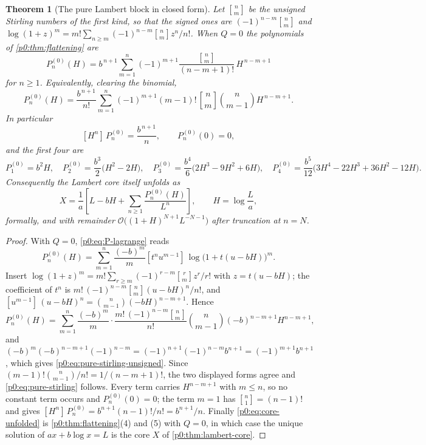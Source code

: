 \documentclass[11pt,a4paper,oneside]{book}
\theoremstyle{plain}
\newtheorem{theorem}{Theorem}[chapter]
\theoremstyle{definition}
\theoremstyle{remark}
\newcommand{\Coef}[1]{[#1]\,}
\newcommand{\bigO}{\mathcal{O}}
\newcommand{\stirlingfirst}[2]{\genfrac{[}{]}{0pt}{}{#1}{#2}}
\begin{document}
\begin{theorem}[The pure Lambert block in closed form]\label{p0:thm:pure-stirling}
Let $\stirlingfirst{n}{m}$ be the \emph{unsigned} Stirling numbers of the first
kind, so that the signed ones are
$(-1)^{n-m}\stirlingfirst{n}{m}$ and
$\log(1+z)^m=m!\sum_{n\ge m}(-1)^{n-m}\stirlingfirst{n}{m}z^n/n!$.  When $Q=0$
the polynomials of \cref{p0:thm:flattening} are
\begin{equation}\label{p0:eq:pure-stirling}
 \boxed{\;
 P_n^{(0)}(H)=b^{\,n+1}\sum_{m=1}^{n}(-1)^{m+1}
   \frac{\stirlingfirst{n}{m}}{(n-m+1)!}\,H^{\,n-m+1}\;}
\end{equation}
for $n\ge1$.  Equivalently, clearing the binomial,
\begin{equation}\label{p0:eq:pure-stirling-unsigned}
 P_n^{(0)}(H)=\frac{b^{\,n+1}}{n!}\sum_{m=1}^{n}(-1)^{m+1}(m-1)!\,
  \stirlingfirst{n}{m}\binom{n}{m-1}H^{\,n-m+1}.
\end{equation}
In particular
\begin{equation}\label{p0:eq:pure-lead}
 \Coef{H^n}P_n^{(0)}=\frac{b^{\,n+1}}{n},
 \qquad P_n^{(0)}(0)=0,
\end{equation}
and the first four are
\begin{equation}\label{p0:eq:pure-first}
 P_1^{(0)}=b^2H,\quad
 P_2^{(0)}=\frac{b^3}{2}\bigl(H^2-2H\bigr),\quad
 P_3^{(0)}=\frac{b^4}{6}\bigl(2H^3-9H^2+6H\bigr),\quad
 P_4^{(0)}=\frac{b^5}{12}\bigl(3H^4-22H^3+36H^2-12H\bigr).
\end{equation}
Consequently the Lambert core itself unfolds as
\begin{equation}\label{p0:eq:core-unfolded}
 X=\frac1a\left[L-bH+\sum_{n\ge1}\frac{P_n^{(0)}(H)}{L^n}\right],
 \qquad H=\log\frac La ,
\end{equation}
formally, and with remainder $\bigO\bigl((1+H)^{N+1}L^{-N-1}\bigr)$ after
truncation at $n=N$.
\end{theorem}

\begin{proof}
With $Q=0$, \eqref{p0:eq:P-lagrange} reads
\[
 P_n^{(0)}(H)=\sum_{m=1}^{n}\frac{(-b)^m}{m}
  \Coef{t^nu^{m-1}}\log\bigl(1+t(u-bH)\bigr)^m .
\]
Insert $\log(1+z)^m=m!\sum_{r\ge m}(-1)^{r-m}\stirlingfirst{r}{m}z^r/r!$ with
$z=t(u-bH)$; the coefficient of $t^n$ is
$m!\,(-1)^{n-m}\stirlingfirst{n}{m}(u-bH)^n/n!$, and
$\Coef{u^{m-1}}(u-bH)^n=\binom{n}{m-1}(-bH)^{n-m+1}$.  Hence
\[
 P_n^{(0)}(H)
 =\sum_{m=1}^{n}\frac{(-b)^m}{m}\cdot
   \frac{m!\,(-1)^{n-m}\stirlingfirst{n}{m}}{n!}
   \binom{n}{m-1}(-b)^{n-m+1}H^{n-m+1},
\]
and $(-b)^{m}(-b)^{n-m+1}(-1)^{n-m}=(-1)^{n+1}(-1)^{n-m}b^{n+1}
=(-1)^{m+1}b^{n+1}$, which gives
\eqref{p0:eq:pure-stirling-unsigned}.  Since
$(m-1)!\binom{n}{m-1}/n!=1/(n-m+1)!$, the two displayed forms agree and
\eqref{p0:eq:pure-stirling} follows.  Every term carries $H^{n-m+1}$ with
$m\le n$, so no constant term occurs and $P_n^{(0)}(0)=0$; the term $m=1$ has
$\stirlingfirst{n}{1}=(n-1)!$ and gives
$\Coef{H^n}P_n^{(0)}=b^{n+1}(n-1)!/n!=b^{n+1}/n$.
Finally \eqref{p0:eq:core-unfolded} is \cref{p0:thm:flattening}(4) and (5)
with $Q=0$, in which case the unique solution of $ax+b\log x=L$ is the core
$X$ of \cref{p0:thm:lambert-core}.
\end{proof}
\end{document}
